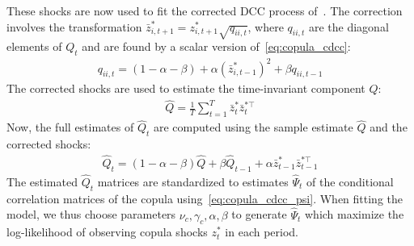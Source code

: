 These shocks are now used to fit the corrected DCC process of~\textcite{Aielli2013}. The correction involves the transformation $\bar{z}_{i,t+1}^* = z_{i,t+1}^* \sqrt{q_{ii,t}}$, where $q_{ii,t}$ are the diagonal elements of $Q_t$ and are found by a scalar version of~\autoref{eq:copula_cdcc}:
\begin{align}
  q_{ii,t} = (1 - \alpha - \beta)
    + \alpha (\bar{z}_{i,t-1}^*)^2
    + \beta q_{ii,t-1}
\end{align}
The corrected shocks are used to estimate the time-invariant component $Q$:
\begin{align}
  \hat{Q} = \frac{1}{T} \sum_{t=1}^T \bar{z}_{t}^* \bar{z}_t^{*\top}
\end{align}
Now, the full estimates of $\hat{Q}_t$ are computed using the sample estimate $\hat{Q}$ and the corrected shocks:
\begin{align}
  \hat{Q}_t = (1 - \alpha - \beta) \hat{Q}
    + \beta \hat{Q}_{t-1}
    + \alpha \bar{z}_{t-1}^* \bar{z}_{t-1}^{*\top}
\end{align}
The estimated $\hat{Q}_t$ matrices are standardized to estimates $\hat{\Psi}_t$ of the conditional correlation matrices of the copula using~\autoref{eq:copula_cdcc_psi}. When fitting the model, we thus choose parameters $\nu_c, \gamma_c, \alpha, \beta$ to generate $\hat{\Psi}_t$ which maximize the log-likelihood of observing copula shocks $z_t^*$ in each period.

